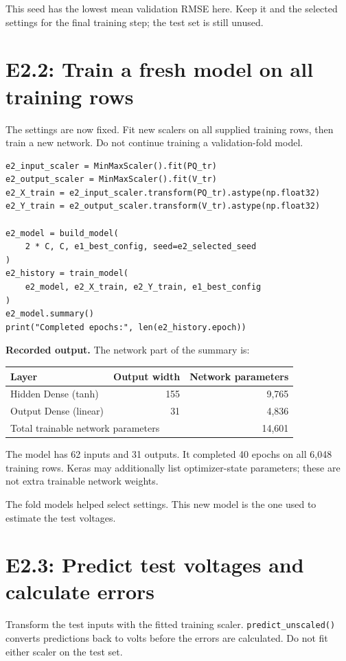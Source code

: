\documentclass[11pt,a4paper]{article}
\begin{document}
This seed has the lowest mean validation RMSE here. Keep it and the
selected settings for the final training step; the test set is still unused.

\clearpage
\section*{E2.2: Train a fresh model on all training rows}
The settings are now fixed. Fit new scalers on all supplied training
rows, then train a new network. Do not continue training a
validation-fold model.

\begin{lstlisting}
e2_input_scaler = MinMaxScaler().fit(PQ_tr)
e2_output_scaler = MinMaxScaler().fit(V_tr)
e2_X_train = e2_input_scaler.transform(PQ_tr).astype(np.float32)
e2_Y_train = e2_output_scaler.transform(V_tr).astype(np.float32)

e2_model = build_model(
    2 * C, C, e1_best_config, seed=e2_selected_seed
)
e2_history = train_model(
    e2_model, e2_X_train, e2_Y_train, e1_best_config
)
e2_model.summary()
print("Completed epochs:", len(e2_history.epoch))
\end{lstlisting}

\textbf{Recorded output.} The network part of the summary is:

\begin{center}
\begin{tabular}{lrr}
\toprule
Layer & Output width & Network parameters \\
\midrule
Hidden Dense (tanh) & 155 & 9,765 \\
Output Dense (linear) & 31 & 4,836 \\
\midrule
\multicolumn{2}{l}{Total trainable network parameters} & 14,601 \\
\bottomrule
\end{tabular}
\end{center}

The model has 62 inputs and 31 outputs. It completed 40 epochs on all
6,048 training rows. Keras may additionally list optimizer-state
parameters; these are not extra trainable network weights.

The fold models helped select settings. This new model is the one used
to estimate the test voltages.

\clearpage
\section*{E2.3: Predict test voltages and calculate errors}
Transform the test inputs with the fitted training scaler.
\texttt{predict\_unscaled()} converts predictions back to volts before
the errors are calculated. Do not fit either scaler on the test set.
\end{document}
